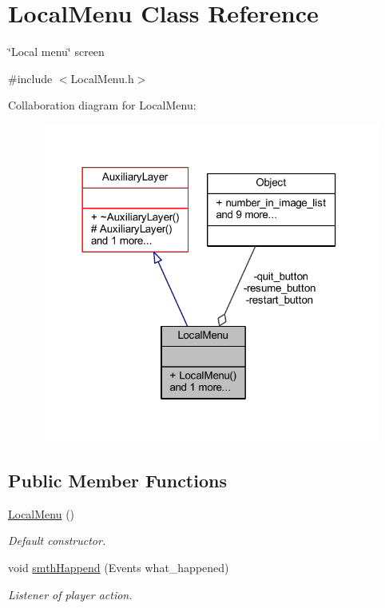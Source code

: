 \hypertarget{class_local_menu}{}\section{Local\+Menu Class Reference}
\label{class_local_menu}


\char`\"{}\+Local menu\char`\"{} screen  




{\ttfamily \#include $<$Local\+Menu.\+h$>$}



Collaboration diagram for Local\+Menu\+:\nopagebreak
\begin{figure}[H]
\begin{center}
\leavevmode
\includegraphics[width=318pt]{class_local_menu__coll__graph}
\end{center}
\end{figure}
\subsection*{Public Member Functions}
\begin{DoxyCompactItemize}
\item 
\mbox{\label{class_local_menu_a5e20a17475cf56d630a80e6972b44261}} 
\hyperlink{class_local_menu_a5e20a17475cf56d630a80e6972b44261}{Local\+Menu} ()
\begin{DoxyCompactList}\small\item\em Default constructor. \end{DoxyCompactList}\item 
void \hyperlink{class_local_menu_ad6db1f0ae5757a4e25269d40f6e369af}{smth\+Happend} (Events what\+\_\+happened)
\begin{DoxyCompactList}\small\item\em Listener of player action. \end{DoxyCompactList}\end{DoxyCompactItemize}
